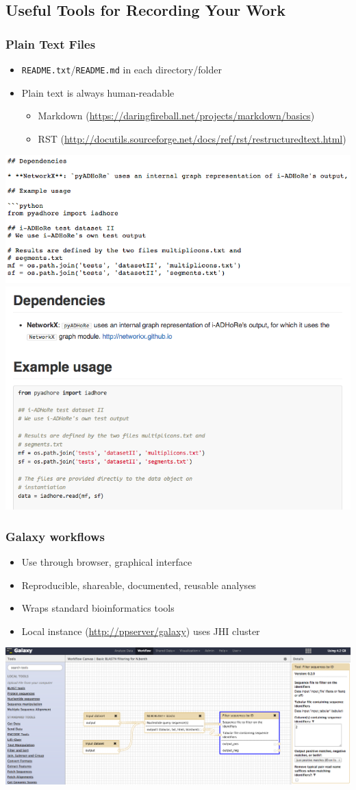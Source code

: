 \documentclass[table]{beamer}
\begin{document}
   \subsection{Useful Tools for Recording Your Work}
   \begin{frame}
     \frametitle{Plain Text Files}
     \begin{itemize}
       \item \texttt{README.txt}/\texttt{README.md} in each directory/folder
       \item Plain text is always human-readable
       \begin{itemize}
         \item Markdown (\url{https://daringfireball.net/projects/markdown/basics})
         \item RST (\url{http://docutils.sourceforge.net/docs/ref/rst/restructuredtext.html})
       \end{itemize}
     \end{itemize}
    \includegraphics[width=.4\textwidth]{images/markdown_before}
	\includegraphics[width=.4\textwidth]{images/markdown_after}
   \end{frame}
   
   \begin{frame}
     \frametitle{Galaxy workflows}
     \begin{itemize}
       \item Use through browser, graphical interface
       \item Reproducible, shareable, documented, reusable analyses
       \item Wraps standard bioinformatics tools
       \item Local instance (\url{http://ppserver/galaxy}) uses JHI cluster       
     \end{itemize}
     \begin{center}
       \includegraphics[width=.75\textwidth]{images/galaxy_screenshot}
     \end{center}
   \end{frame}      
   
\end{document}
